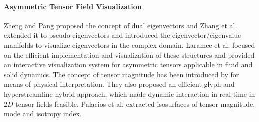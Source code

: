 \documentclass{scrartcl}
\begin{document}
\paragraph{Asymmetric Tensor Field Visualization}
Zheng and Pang \cite{pang&zheng} proposed the concept of dual eigenvectors and Zhang et al. \cite{zhang} extended it to pseudo-eigenvectors and introduced the eigenvector/eigenvalue manifolds to visualize eigenvectors in the complex domain. Laramee et al. \cite{laramee} focused on the efficient implementation and visualization of these structures and provided an interactive visualization system for asymmetric tensors applicable in fluid and solid dynamics. The concept of tensor magnitude has been introduced by \cite{laramee} for means of physical interpretation. They also proposed an efficient glyph and hyperstreamline hybrid approach, which made dynamic interaction in real-time in $2D$ tensor fields feasible. Palacios et al. \cite{palacios} extracted isosurfaces of tensor magnitude, mode and isotropy index.
\end{document}
